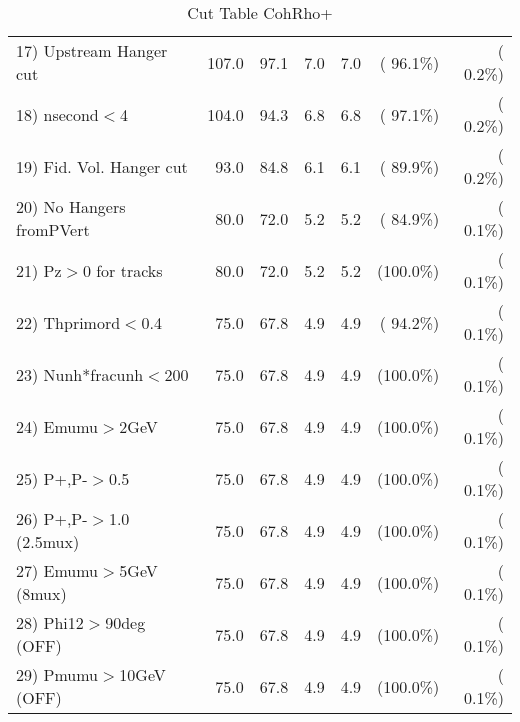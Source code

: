 \begin{table}[h!]
\begin{tabular}{||l||r|r|r|r|r|r||}
 17) Upstream Hanger cut  &        107.0 &         97.1 &          7.0 &          7.0 & ( 96.1\%) & (  0.2\%) \\
 18) nsecond$<$4          &        104.0 &         94.3 &          6.8 &          6.8 & ( 97.1\%) & (  0.2\%) \\
 19) Fid. Vol. Hanger cut &         93.0 &         84.8 &          6.1 &          6.1 & ( 89.9\%) & (  0.2\%) \\
 20) No Hangers fromPVert &         80.0 &         72.0 &          5.2 &          5.2 & ( 84.9\%) & (  0.1\%) \\
 21) Pz$>$0 for tracks    &         80.0 &         72.0 &          5.2 &          5.2 & (100.0\%) & (  0.1\%) \\
 22) Thprimord$<$0.4      &         75.0 &         67.8 &          4.9 &          4.9 & ( 94.2\%) & (  0.1\%) \\
 23) Nunh*fracunh$<$200   &         75.0 &         67.8 &          4.9 &          4.9 & (100.0\%) & (  0.1\%) \\
 24) Emumu$>$2GeV         &         75.0 &         67.8 &          4.9 &          4.9 & (100.0\%) & (  0.1\%) \\
 25) P+,P-$>$0.5          &         75.0 &         67.8 &          4.9 &          4.9 & (100.0\%) & (  0.1\%) \\
 26) P+,P-$>$1.0 (2.5mux) &         75.0 &         67.8 &          4.9 &          4.9 & (100.0\%) & (  0.1\%) \\
 27) Emumu$>$5GeV  (8mux) &         75.0 &         67.8 &          4.9 &          4.9 & (100.0\%) & (  0.1\%) \\
 28) Phi12$>$90deg  (OFF) &         75.0 &         67.8 &          4.9 &          4.9 & (100.0\%) & (  0.1\%) \\
 29) Pmumu$>$10GeV  (OFF) &         75.0 &         67.8 &          4.9 &          4.9 & (100.0\%) & (  0.1\%) \\
 \hline
 \hline
 \end{tabular}
 \caption{Cut Table  CohRho+  }
 \label{tab-cutcohjpsi-mumu_anumunc}
 \end{table}
